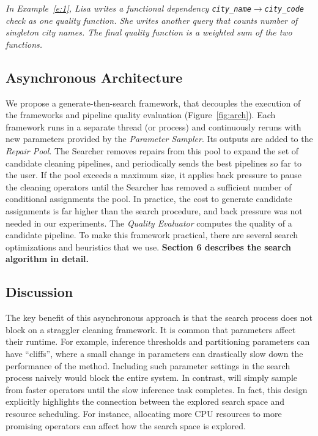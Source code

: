 \begin{example}\it\label{e:3}
   In Example~\ref{e:1}, Lisa writes a functional dependency \texttt{city\_name$\rightarrow$city\_code} check as one quality function.  She writes another query that counts number of singleton city names. The final quality function is a weighted sum of the two functions.
\end{example}

\subsection{Asynchronous Architecture}
We propose a generate-then-search framework, that decouples the execution of the frameworks and pipeline quality evaluation (Figure~\ref{fig:arch}).  Each framework runs in a separate thread (or process) and continuously reruns with new parameters provided by the {\it Parameter Sampler}.   Its outputs are added to the {\it Repair Pool}.  The Searcher removes repairs from this pool to expand the set of candidate cleaning pipelines, and periodically sends the best pipelines so far to the user.   If the pool exceeds a maximum size, it applies back pressure to pause the cleaning operators until the Searcher has removed a sufficient number of conditional assignments the pool.  In practice, the cost to generate candidate assignments is far higher than the search procedure, and back pressure was not needed in our experiments.   The {\it Quality Evaluator} computes the quality of a candidate pipeline.
To make this framework practical, there are several search optimizations and heuristics that we use.
\textbf{Section 6 describes the search algorithm in detail.}


\subsection{Discussion} 
The key benefit of this asynchronous approach is that the search process does not block on a straggler cleaning framework.  It is common that parameters affect their runtime.  For example, inference thresholds and partitioning parameters can have ``cliffs'', where a small change in parameters can drastically slow down the performance of the method. Including such parameter settings in the search process naively would block the entire system.  In contrast, \sys will simply sample from faster operators until the slow inference task completes.    In fact, this design explicitly highlights the connection between the explored search space and resource scheduling.  For instance,  allocating more CPU resources to more promising operators can affect how the search space is explored.

